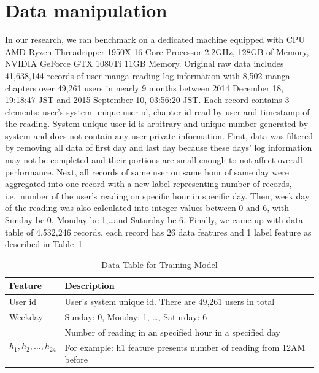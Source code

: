\documentclass[English]{dicomopapers}
\begin{document}
\section{Data manipulation}
In our research, we ran benchmark on a dedicated machine equipped with CPU AMD Ryzen Threadripper 1950X 16-Core Processor 2.2GHz, 128GB of Memory, NVIDIA GeForce GTX 1080Ti 11GB Memory\@. Original raw data includes 41,638,144 records of user manga reading log information with 8,502 manga chapters over 49,261 users in nearly 9 months between 2014 December 18, 19:18:47 JST and 2015 September 10, 03:56:20 JST\@. Each record contains 3 elements: user's system unique user id, chapter id read by user and timestamp of the reading. System unique user id is arbitrary and unique number generated by system and does not contain any user private information.\newline
First, data was filtered by removing all data of first day and last day because these days' log information may not be completed and their portions are small enough to not affect overall performance. Next, all records of same user on same hour of same day were aggregated into one record with a new label representing number of records, i.e.\ number of the user's reading on specific hour in specific day. Then, week day of the reading was also calculated into integer values between 0 and 6, with Sunday be 0, Monday be 1,\ldots and Saturday be 6. Finally, we came up with data table of 4,532,246 records, each record has 26 data features and 1 label feature as described in Table~\ref{table:db_description}\newline
\begin{center}
  \begin{table}
    \caption{Data Table for Training Model}\label{table:db_description}
    \begin{tabular}{|l|l|}
      \toprule
      \textbf{Feature} & \textbf{Description} \\
      \midrule
      {User id} & {User's system unique id. There are 49,261 users in total} \\
      \midrule
      {Weekday} & {Sunday: 0, Monday: 1, \ldots, Saturday: 6} \\
      \midrule
      \multirow{2}{*}{\(h_1, h_2, \ldots, h_{24}\)} & {Number of reading in an specified hour in a specified day} \\
      & {For example: h1 feature presents number of reading from 12AM before}\\
      \bottomrule
    \end{tabular}
    \newline
  \end{table}
\end{center}
\end{document}
